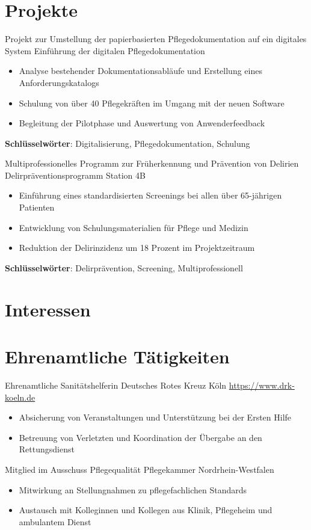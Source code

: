 \documentclass[a4paper, serif, 10pt]{moderncv}
\begin{document}
\section{Projekte}

        {Projekt zur Umstellung der papierbasierten Pflegedokumentation auf ein digitales System}
        {Einführung der digitalen Pflegedokumentation}
        {}
        {}
        {\begin{itemize}
\item Analyse bestehender Dokumentationsabläufe und Erstellung eines Anforderungskatalogs
\item Schulung von über 40 Pflegekräften im Umgang mit der neuen Software
\item Begleitung der Pilotphase und Auswertung von Anwenderfeedback
\end{itemize}
\textbf{Schlüsselwörter}: Digitalisierung, Pflegedokumentation, Schulung}

        {Multiprofessionelles Programm zur Früherkennung und Prävention von Delirien}
        {Delirpräventionsprogramm Station 4B}
        {}
        {}
        {\begin{itemize}
\item Einführung eines standardisierten Screenings bei allen über 65-jährigen Patienten
\item Entwicklung von Schulungsmaterialien für Pflege und Medizin
\item Reduktion der Delirinzidenz um 18 Prozent im Projektzeitraum
\end{itemize}
\textbf{Schlüsselwörter}: Delirprävention, Screening, Multiprofessionell}
\section{Interessen}

\section{Ehrenamtliche Tätigkeiten}

        {Ehrenamtliche Sanitätshelferin}
        {Deutsches Rotes Kreuz Köln}
        {\url{https://www.drk-koeln.de}}
        {}
        {\begin{itemize}
\item Absicherung von Veranstaltungen und Unterstützung bei der Ersten Hilfe
\item Betreuung von Verletzten und Koordination der Übergabe an den Rettungsdienst
\end{itemize}}
    

        {Mitglied im Ausschuss Pflegequalität}
        {Pflegekammer Nordrhein-Westfalen}
        {}
        {}
        {\begin{itemize}
\item Mitwirkung an Stellungnahmen zu pflegefachlichen Standards
\item Austausch mit Kolleginnen und Kollegen aus Klinik, Pflegeheim und ambulantem Dienst
\end{itemize}}
    
\end{document}
